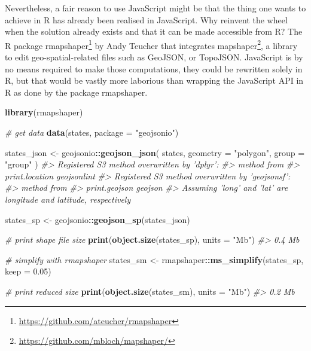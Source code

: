 \documentclass[10pt,]{krantz}
\makeatletter
\newenvironment{Shaded}{\begin{snugshade}}{\end{snugshade}}
\newcommand{\CommentTok}[1]{\textcolor[rgb]{0.37,0.37,0.37}{\textit{#1}}}
\newcommand{\DataTypeTok}[1]{\textcolor[rgb]{0.27,0.27,0.27}{#1}}
\newcommand{\FloatTok}[1]{\textcolor[rgb]{0.06,0.06,0.06}{#1}}
\newcommand{\KeywordTok}[1]{\textcolor[rgb]{0.27,0.27,0.27}{\textbf{#1}}}
\newcommand{\NormalTok}[1]{#1}
\newcommand{\OperatorTok}[1]{\textcolor[rgb]{0.43,0.43,0.43}{\textbf{#1}}}
\newcommand{\StringTok}[1]{\textcolor[rgb]{0.5,0.5,0.5}{#1}}
\renewcommand{\href}[2]{#2\footnote{\url{#1}}}
\newenvironment{kframe}{%
\medskip{}
\setlength{\fboxsep}{.8em}
 \def\at@end@of@kframe{}%
 \ifinner\ifhmode%
  \def\at@end@of@kframe{\end{minipage}}%
  \begin{minipage}{\columnwidth}%
 \fi\fi%
 \def\FrameCommand##1{\hskip\@totalleftmargin \hskip-\fboxsep
 \colorbox{shadecolor}{##1}\hskip-\fboxsep
     \hskip-\linewidth \hskip-\@totalleftmargin \hskip\columnwidth}%
 \MakeFramed {\advance\hsize-\width
   \@totalleftmargin\z@ \linewidth\hsize
   \@setminipage}}%
 {\par\unskip\endMakeFramed%
 \at@end@of@kframe}
\renewenvironment{Shaded}{\begin{kframe}}{\end{kframe}}
\makeatother
\begin{document}
Nevertheless, a fair reason to use JavaScript might be that the thing one wants to achieve in R has already been realised in JavaScript. Why reinvent the wheel when the solution already exists and that it can be made accessible from R? The R package \href{https://github.com/ateucher/rmapshaper}{rmapshaper} \citep{R-rmapshaper} by Andy Teucher that integrates \href{https://github.com/mbloch/mapshaper/}{mapshaper}, a library to edit geo-spatial-related files such as GeoJSON, or TopoJSON. JavaScript is by no means required to make those computations, they could be rewritten solely in R, but that would be vastly more laborious than wrapping the JavaScript API in R as done by the package rmapshaper.

\begin{Shaded}
\begin{Highlighting}[]
\KeywordTok{library}\NormalTok{(rmapshaper)}

\CommentTok{# get data}
\KeywordTok{data}\NormalTok{(states, }\DataTypeTok{package =} \StringTok{"geojsonio"}\NormalTok{)}

\NormalTok{states_json <-}\StringTok{ }\NormalTok{geojsonio}\OperatorTok{::}\KeywordTok{geojson_json}\NormalTok{(}
\NormalTok{  states, }
  \DataTypeTok{geometry =} \StringTok{"polygon"}\NormalTok{, }
  \DataTypeTok{group =} \StringTok{"group"}
\NormalTok{)}
\CommentTok{#> Registered S3 method overwritten by 'dplyr':}
\CommentTok{#>   method         from       }
\CommentTok{#>   print.location geojsonlint}
\CommentTok{#> Registered S3 method overwritten by 'geojsonsf':}
\CommentTok{#>   method        from   }
\CommentTok{#>   print.geojson geojson}
\CommentTok{#> Assuming 'long' and 'lat' are longitude and latitude, respectively}

\NormalTok{states_sp <-}\StringTok{ }\NormalTok{geojsonio}\OperatorTok{::}\KeywordTok{geojson_sp}\NormalTok{(states_json)}

\CommentTok{# print shape file size}
\KeywordTok{print}\NormalTok{(}\KeywordTok{object.size}\NormalTok{(states_sp), }\DataTypeTok{units =} \StringTok{"Mb"}\NormalTok{)}
\CommentTok{#> 0.4 Mb}

\CommentTok{# simplify with rmapshaper}
\NormalTok{states_sm <-}\StringTok{ }\NormalTok{rmapshaper}\OperatorTok{::}\KeywordTok{ms_simplify}\NormalTok{(states_sp, }\DataTypeTok{keep =} \FloatTok{0.05}\NormalTok{)}

\CommentTok{# print reduced size}
\KeywordTok{print}\NormalTok{(}\KeywordTok{object.size}\NormalTok{(states_sm), }\DataTypeTok{units =} \StringTok{"Mb"}\NormalTok{)}
\CommentTok{#> 0.2 Mb}
\end{Highlighting}
\end{Shaded}
\end{document}
